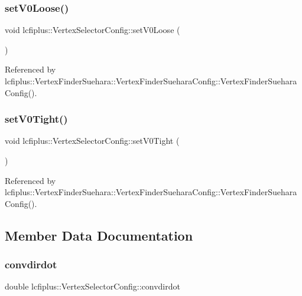 \subsubsection{set\+V0\+Loose()}
{\footnotesize\ttfamily void lcfiplus\+::\+Vertex\+Selector\+Config\+::set\+V0\+Loose (\begin{DoxyParamCaption}{ }\end{DoxyParamCaption})\hspace{0.3cm}{\ttfamily [inline]}}



Referenced by lcfiplus\+::\+Vertex\+Finder\+Suehara\+::\+Vertex\+Finder\+Suehara\+Config\+::\+Vertex\+Finder\+Suehara\+Config().

\mbox{\label{classlcfiplus_1_1VertexSelectorConfig_a848e524ed34fb46f3e8e940a03a4acb1}} 
\subsubsection{set\+V0\+Tight()}
{\footnotesize\ttfamily void lcfiplus\+::\+Vertex\+Selector\+Config\+::set\+V0\+Tight (\begin{DoxyParamCaption}{ }\end{DoxyParamCaption})\hspace{0.3cm}{\ttfamily [inline]}}



Referenced by lcfiplus\+::\+Vertex\+Finder\+Suehara\+::\+Vertex\+Finder\+Suehara\+Config\+::\+Vertex\+Finder\+Suehara\+Config().



\subsection{Member Data Documentation}
\mbox{\label{classlcfiplus_1_1VertexSelectorConfig_a168078c6db3730f6264134283b8a7fe4}} 
\subsubsection{convdirdot}
{\footnotesize\ttfamily double lcfiplus\+::\+Vertex\+Selector\+Config\+::convdirdot}



